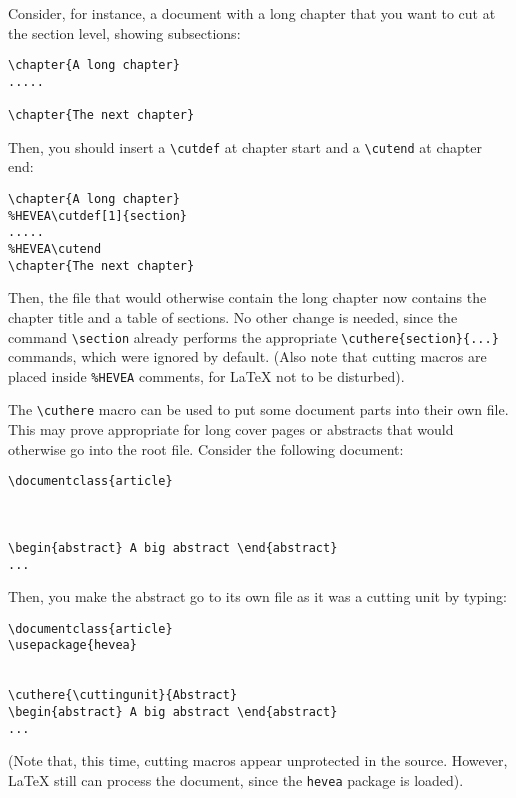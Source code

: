 Consider, for instance, a  document with a long chapter
that you want to cut at the section level, showing subsections:
\begin{verbatim}
\chapter{A long chapter}
.....

\chapter{The next chapter}
\end{verbatim}
Then, you should insert a \verb+\cutdef+ at chapter start and a
\verb+\cutend+ at chapter end:
\begin{verbatim}
\chapter{A long chapter}
%HEVEA\cutdef[1]{section}
.....
%HEVEA\cutend
\chapter{The next chapter}
\end{verbatim}
Then, the file
that would otherwise contain the long chapter now contains the chapter
title and a table of sections.
No other change is needed, since the command \verb+\section+ already
performs the appropriate \verb+\cuthere{section}{...}+ commands,
which were ignored by default.
(Also note that cutting macros are placed inside \verb+%HEVEA+ comments,
for \LaTeX{} not to be disturbed).

The \verb+\cuthere+ macro can be used to put some document parts into
their own file.
This may prove appropriate for long cover pages or abstracts that would
otherwise go into the root file.
Consider the following document:
\begin{verbatim}
\documentclass{article}



\begin{abstract} A big abstract \end{abstract}
...
\end{verbatim}
Then, you make the abstract go to its own file as it was a cutting
unit by typing:
\begin{verbatim}
\documentclass{article}
\usepackage{hevea}


\cuthere{\cuttingunit}{Abstract}
\begin{abstract} A big abstract \end{abstract}
...
\end{verbatim}
(Note that, this time, cutting macros appear unprotected in the
source. However, \LaTeX{} still can process the document, since the
\texttt{hevea} package is loaded).


